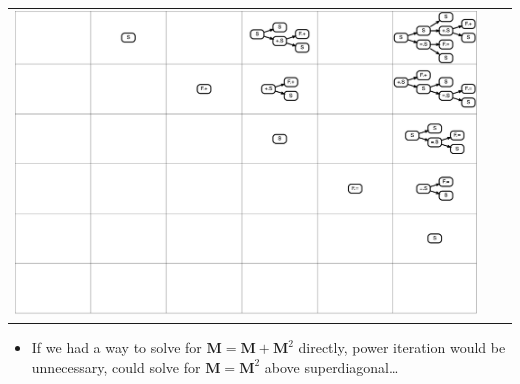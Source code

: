 \documentclass[portrait,a0b,final,a4resizeable]{a0poster}
\def\jointspacing{\vspace{0.3in}}
\begin{document}
\begin{poster}
\begin{multicols}{2}
\begin{minipage}[c]{0.90\columnwidth}
\begin{tabular}{ c c c }
        \includegraphics[trim=420 287 0 0,clip, width=12.34cm]{../figures/parse4.png}
      \end{tabular}
      \begin{itemize}
        \item If we had a way to solve for $\mathbf{M = M + M}^2$ directly, power iteration would be unnecessary, could solve for $\mathbf{M = M}^2$ above superdiagonal\ldots
      \end{itemize}
      \end{minipage}
      \jointspacing


\end{multicols}
\end{poster}
\end{document}
